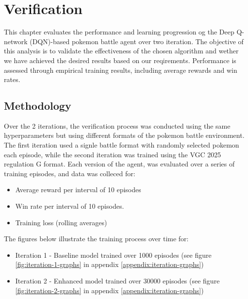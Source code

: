 \section{Verification}
\label{sec:verification}

This chapter evaluates the performance and learning progression og the Deep Q-network
(DQN)-based pokemon battle agent over two iteration. The objective of this analysis
is to validate the effectiveness of the chosen algorithm and wether we have achieved
the desired results based on our reqirements. Performance is assessed through empirical
training results, including average rewards and win rates.

\subsection{Methodology}
Over the 2 iterations, the verification process was conducted using the same hyperparameters
but using different formats of the pokemon battle environment.
The first iteration used a signle battle format with randomly selected pokemon each
episode, while the second iteration was trained using the VGC 2025 regulation G format.
Each version of the agent, was evaluated over a series of training episodes, and data
was colleced for:
\begin{itemize}
    \item Average reward per interval of 10 episodes
    \item Win rate per interval of 10 episodes.
    \item Training loss (rolling averages)
\end{itemize}
The figures below illustrate the training process over time for:
\begin{itemize}
    \item Iteration 1 - Baseline model trained over 1000 episodes (see figure \ref{fig:iteration-1-graphs} in appendix \ref{appendix:iteration-graphs})
    \item Iteration 2 - Enhanced model trained over 30000 episodes (see figure \ref{fig:iteration-2-graphs} in appendix \ref{appendix:iteration-graphs})
\end{itemize}

